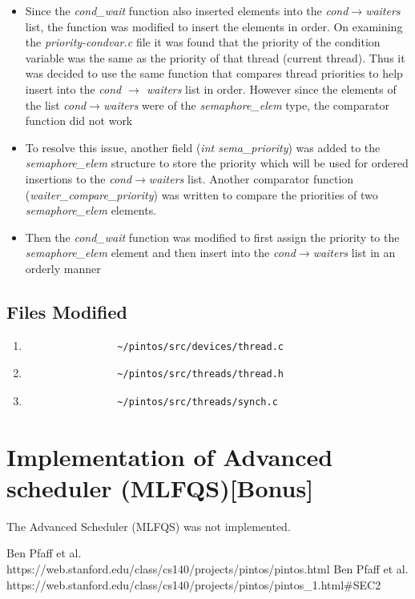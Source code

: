 \documentclass[]{article}
\begin{document}
		\begin{itemize}
			\item Since the \textit{cond\_wait} function also inserted elements into the \textit{cond$\rightarrow$waiters} list, the function was modified to insert the elements in order. On examining the \textit{priority-condvar.c} file it was found that the priority of the condition variable was the same as the priority of that thread (current thread). Thus it was decided to use the same function that compares thread priorities to help insert into the \textit{cond $\rightarrow$ waiters} list in order. However since the elements of the list \textit{cond$\rightarrow$waiters} were of the \textit{semaphore\_elem} type, the comparator function did not work
			\item To resolve this issue, another field (\textit{int sema\_priority}) was added to the \textit{semaphore\_elem} structure to store the priority which will be used for ordered insertions to the \textit{cond$\rightarrow$waiters} list. Another comparator function (\textit{waiter\_compare\_priority}) was written to compare the priorities of two \textit{semaphore\_elem} elements.
			\item Then the \textit{cond\_wait} function was modified to first assign the priority to the \textit{semaphore\_elem} element and then insert into the \textit{cond$\rightarrow$waiters} list in an orderly manner
		\end{itemize}
		
	
	\subsection{Files Modified}
		\begin{enumerate}
			\item \begin{verbatim}
				~/pintos/src/devices/thread.c
			\end{verbatim}
			\item \begin{verbatim}
				~/pintos/src/threads/thread.h
			\end{verbatim}
			\item \begin{verbatim}
				~/pintos/src/threads/synch.c
			\end{verbatim}
		\end{enumerate}	
	
\section{Implementation of Advanced scheduler (MLFQS)[Bonus]}
	The Advanced Scheduler (MLFQS) was not implemented.	
	
	
\begin{thebibliography}{bib}
	 Ben Pfaff et al.\\ https://web.stanford.edu/class/cs140/projects/pintos/pintos.html
	 Ben Pfaff et al.\\ https://web.stanford.edu/class/cs140/projects/pintos/pintos\_1.html\#SEC2
\end{thebibliography}
\end{document}
